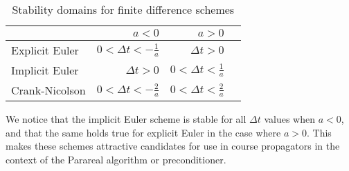 \begin{table}[!h]
\caption{Stability domains for finite difference schemes}
\label{stability_table}
\centering
\begin{tabular}{lrrr}
\toprule
{} & $a<0$   & $a>0$  \\
\midrule
Explicit Euler & $0<\Delta t<-\frac{1}{a}$ & $\Delta t>0$ \\
Implicit Euler & $\Delta t>0$ & $0<\Delta t<\frac{1}{a}$ \\
Crank-Nicolson & $0<\Delta t<-\frac{2}{a}$ & $0<\Delta t<\frac{2}{a}$ \\
\bottomrule
\end{tabular}
\end{table}
We notice that the implicit Euler scheme is stable for all $\Delta t$ values when $a<0$, and that the same holds true for explicit Euler in the case where $a>0$. This makes these schemes attractive candidates for use in course propagators in the context of the Parareal algorithm or preconditioner. 
